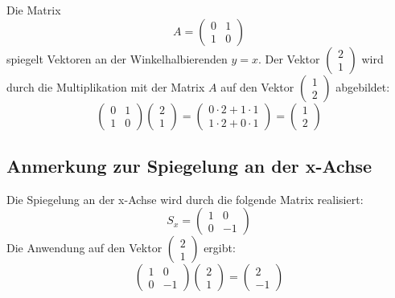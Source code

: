 Die Matrix \[ A = \begin{pmatrix} 0 & 1 \\ 1 & 0 \end{pmatrix} \] spiegelt Vektoren an der Winkelhalbierenden $y=x$.
Der Vektor \begin{math}\begin{pmatrix} 2 \\ 1 \end{pmatrix}\end{math} wird durch die Multiplikation mit der Matrix $A$ auf den Vektor \begin{math}\begin{pmatrix} 1 \\ 2 \end{pmatrix}\end{math} abgebildet:
\[ \begin{pmatrix} 0 & 1 \\ 1 & 0 \end{pmatrix} \begin{pmatrix} 2 \\ 1 \end{pmatrix} = \begin{pmatrix} 0 \cdot 2 + 1 \cdot 1 \\ 1 \cdot 2 + 0 \cdot 1 \end{pmatrix} = \begin{pmatrix} 1 \\ 2 \end{pmatrix} \]

\subsection{Anmerkung zur Spiegelung an der x-Achse}
Die Spiegelung an der x-Achse wird durch die folgende Matrix realisiert:
\[ S_x = \begin{pmatrix} 1 & 0 \\ 0 & -1 \end{pmatrix} \]
Die Anwendung auf den Vektor \begin{math}\begin{pmatrix} 2 \\ 1 \end{pmatrix}\end{math} ergibt:
\[ \begin{pmatrix} 1 & 0 \\ 0 & -1 \end{pmatrix} \begin{pmatrix} 2 \\ 1 \end{pmatrix} = \begin{pmatrix} 2 \\ -1 \end{pmatrix} \]

